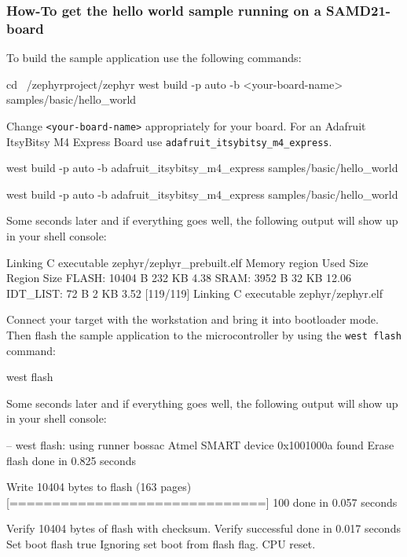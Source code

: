 

\subsubsection{How-To get the hello world sample running on a SAMD21-board}

To build the sample application use the following commands:

\begin{bashbox}
cd ~/zephyrproject/zephyr
west build -p auto -b <your-board-name> samples/basic/hello_world
\end{bashbox}

Change \texttt{<your-board-name>} appropriately for your board. For an Adafruit ItsyBitsy M4 Express Board use \texttt{adafruit_itsybitsy_m4_express}.


\begin{bashbox}
west build -p auto -b adafruit_itsybitsy_m4_express samples/basic/hello_world
\end{bashbox}

\begin{bashbox}
west build -p auto -b adafruit_itsybitsy_m4_express samples/basic/hello_world
\end{bashbox}


Some seconds later and if everything goes well, the following output will show up in your shell console:

\begin{textbox}
[114/119] Linking C executable zephyr/zephyr_prebuilt.elf
Memory region         Used Size  Region Size  %
           FLASH:       10404 B       232 KB      4.38%
            SRAM:        3952 B        32 KB     12.06%
        IDT_LIST:          72 B         2 KB      3.52%
[119/119] Linking C executable zephyr/zephyr.elf
\end{textbox}


Connect your target with the workstation and bring it into bootloader mode. Then flash the sample application to the microcontroller by using the \texttt{west flash} command:

\begin{bashbox}
west flash
\end{bashbox}

Some seconds later and if everything goes well, the following output will show up in your shell console:

\begin{textbox}
-- west flash: using runner bossac
Atmel SMART device 0x1001000a found
Erase flash
done in 0.825 seconds

Write 10404 bytes to flash (163 pages)
[==============================] 100%
done in 0.057 seconds

Verify 10404 bytes of flash with checksum.
Verify successful
done in 0.017 seconds
Set boot flash true
Ignoring set boot from flash flag.
CPU reset.
\end{textbox}

